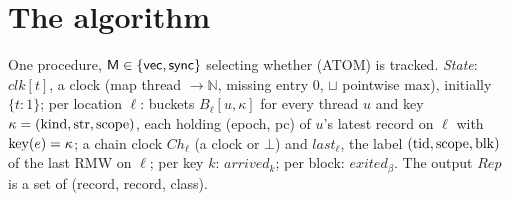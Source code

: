 \documentclass[11pt]{article}
\theoremstyle{remark}
\DeclareMathOperator{\tid}{tid}\DeclareMathOperator{\pc}{pc}\DeclareMathOperator{\seq}{seq}
\DeclareMathOperator{\str}{str}\DeclareMathOperator{\scope}{scope}\DeclareMathOperator{\epoch}{epoch}
\newcommand{\clk}{\mathit{clk}}\newcommand{\Bk}{B}\newcommand{\Ch}{\mathit{Ch}}\newcommand{\lastr}{\mathit{last}}
\newcommand{\arrv}{\mathit{arrived}}\newcommand{\gone}{\mathit{exited}}\newcommand{\Rep}{\mathit{Rep}}
\begin{document}
\section{The algorithm}\label{sec:alg}

One procedure, $\mathsf{M}\in\{\mathsf{vec},\mathsf{sync}\}$ selecting whether (ATOM) is
tracked. \emph{State}: $\clk[t]$, a clock (map thread $\to\mathbb{N}$, missing entry $0$,
$\sqcup$ pointwise max), initially $\{t\!:\!1\}$; per location $\ell$: buckets
$\Bk_\ell[u,\kappa]$ for every thread $u$ and key
$\kappa=(\kind,\str,\scope)$, each holding (epoch, pc) of $u$'s latest record on $\ell$ with
$\operatorname{key}(e)=\kappa$; a chain clock $\Ch_\ell$ (a clock or $\bot$) and $\lastr_\ell$, the label
$(\tid,\scope,\blk)$ of the last RMW on $\ell$; per key $k$: $\arrv_k$; per block:
$\gone_\beta$. The output $\Rep$ is a set of (record, record, class).
\end{document}
